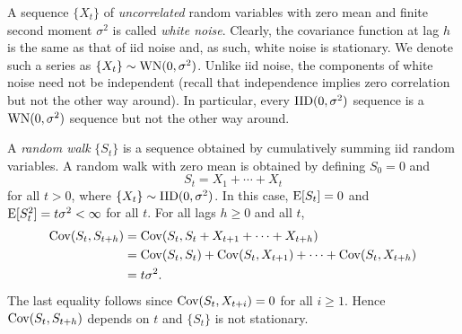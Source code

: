 \begin{example}
A sequence $\{ X_t \}$ of \emph{uncorrelated} random variables with zero mean 
and finite second moment $\sigma^2$ is called \emph{white noise}. Clearly, the 
covariance function at lag $h$ is the same as that of iid noise and, as such, 
white noise is stationary. We denote such a series as
$\{ X_t \} \sim \operatorname{WN} (0, \sigma^2)$. Unlike iid noise, the 
components of white noise need not be independent (recall that independence 
implies zero correlation but not the other way around). In particular, every
$\operatorname{IID} (0, \sigma^2)$ sequence is a $\operatorname{WN} (0, \sigma^2)$ sequence 
but not the other way around. 
\end{example}

\begin{example}
 A \emph{random walk} $\{ S_t \}$ is a sequence obtained by cumulatively summing 
iid random variables. A random walk with zero mean is obtained by defining 
$S_0 = 0$ and 
\[
    S_t = X_1 + \cdots + X_t
\]
for all $t > 0$, where $\{ X_t \} \sim \operatorname{IID}(0, \sigma^2)$. In this case, 
$\operatorname{E} [S_t] = 0$ and $\operatorname{E} [S_t^2] = t \sigma^2 < \infty$ for all $t$. For all lags 
$h \geq 0$ and all $t$,
\begin{align*}
    \operatorname{Cov} (S_t, S_{t + h}) 
        & = \operatorname{Cov} (S_t, S_t + X_{t + 1} + \cdots + X_{t + h}) \\
        & = \operatorname{Cov} (S_t, S_t) + \operatorname{Cov} (S_t, X_{t + 1}) + \cdots + \operatorname{Cov} (S_t, X_{t + h}) \\
        & = t \sigma^2.  
\end{align*}
The last equality follows since $\operatorname{Cov} (S_t, X_{t + i}) = 0$ for all $i \geq 1$.
Hence $\operatorname{Cov} (S_t, S_{t + h})$ depends on $t$ and $\{ S_t \}$ is not stationary.
\end{example}

